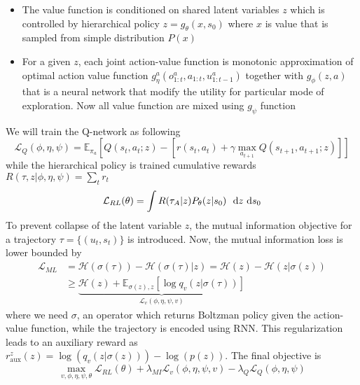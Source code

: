 \begin{itemize}
    \item The value function is conditioned on shared latent variables $z$ which is controlled by hierarchical policy $z = g_\theta(x, s_0)$ where $x$ is value that is sampled from simple distribution $P(x)$
    \item For a given $z$, each joint action-value function is monotonic approximation of optimal action value function $g_{\eta}^a(o^a_{1:t}, a_{1:t}, u^{a}_{1:t-1})$ together with $g_{\phi}(z, a)$ that is a neural network that modify the utility for particular mode of exploration. Now all value function are mixed using $g_{\psi}$ function 
\end{itemize}
We will train the Q-network as following 
\begin{equation}
    \mathcal{L}_{Q}(\phi, \eta,\psi) = \mathbb{E}_{\pi_a}  \left[ Q(s_t, a_t ; z) - \left[r(s_t, a_t) + \gamma \max_{a_{t+1}} Q(s_{t+1}, a_{t+1} ; z)\right] \right]
\end{equation}
while the hierarchical policy is trained cumulative rewards $R(\tau, z | \phi, \eta, \psi)= \sum_t r_t$ 
\begin{equation}
    \mathcal{L}_{RL}(\theta) = \int R(\tau_A | z)P_{\theta}(z | s_0) \ \ \mathrm{d} z\ \mathrm{d} s_0
\end{equation}
To prevent collapse of the latent variable $z$, the mutual information objective for a trajectory $\tau = \{(u_t, s_t)\}$ is introduced. Now, the mutual information loss is lower bounded by
\begin{equation}
\begin{aligned}
    \mathcal{L}_{ML} &= \mathcal{H}(\sigma(\tau)) - \mathcal{H}(\sigma(\tau) | z) = \mathcal{H}(z) - \mathcal{H}(z | \sigma(z)) \\
    &\ge \underbrace{\mathcal{H}(z) + \mathbb{E}_{\sigma(z), z} \left[ \log q_v(z | \sigma(\tau)) \right]}_{\mathcal{L}_v(\phi, \eta, \psi, v)}
\end{aligned}
\end{equation}
where we need $\sigma$, an operator which returns Boltzman policy given the action-value function, while the trajectory is encoded using RNN. This regularization leads to an auxiliary reward as $r^z_{\text{aux}} (z) = \log(q_v(z | \sigma(z))) - \log  (p(z))$. The final objective is 
\begin{equation}
    \max_{v, \phi, \eta, \psi, \theta} \mathcal{L}_{RL}(\theta) + \lambda_{MI}\mathcal{L}_v(\phi, \eta, \psi, v) - \lambda_{Q}\mathcal{L}_{Q}(\phi, \eta,\psi)
\end{equation}